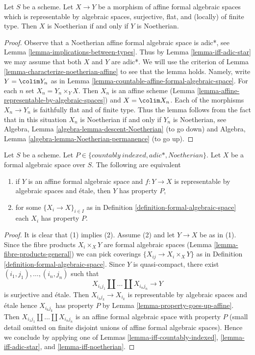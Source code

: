 \begin{lemma}
\label{lemma-iff-noetherian}
Let $S$ be a scheme. Let $X \to Y$ be a morphism of affine
formal algebraic spaces which is representable by algebraic spaces,
surjective, flat, and (locally) of finite type. Then $X$ is Noetherian
if and only if $Y$ is Noetherian.
\end{lemma}

\begin{proof}
Observe that a Noetherian affine formal algebraic space is adic*, see
Lemma \ref{lemma-implications-between-types}. Thus by
Lemma \ref{lemma-iff-adic-star} we may assume that both $X$ and $Y$
are adic*. We will use the criterion of
Lemma \ref{lemma-characterize-noetherian-affine}
to see that the lemma holds. Namely, write $Y = \colim Y_n$
as in Lemma \ref{lemma-countable-affine-formal-algebraic-space}.
For each $n$ set $X_n = Y_n \times_Y X$. Then $X_n$ is an
affine scheme (Lemma \ref{lemma-affine-representable-by-algebraic-spaces})
and $X = \colim X_n$. Each of the morphisms $X_n \to Y_n$ is
faithfully flat and of finite type. Thus the lemma follows from the
fact that in this situation $X_n$ is Noetherian if and only if $Y_n$
is Noetherian, see
Algebra, Lemma \ref{algebra-lemma-descent-Noetherian} (to go down)
and
Algebra, Lemma \ref{algebra-lemma-Noetherian-permanence} (to go up).
\end{proof}

\begin{lemma}
\label{lemma-type-local}
Let $S$ be a scheme. Let $P \in \{countably\ indexed, adic*, Noetherian\}$.
Let $X$ be a formal algebraic space over $S$.
The following are equivalent
\begin{enumerate}
\item if $Y$ is an affine formal algebraic space and
$f : Y \to X$ is representable by algebraic spaces and \'etale,
then $Y$ has property $P$,
\item for some $\{X_i \to X\}_{i \in I}$ as in
Definition \ref{definition-formal-algebraic-space}
each $X_i$ has property $P$.
\end{enumerate}
\end{lemma}

\begin{proof}
It is clear that (1) implies (2). Assume (2) and let
$Y \to X$ be as in (1). Since the fibre products $X_i \times_X Y$
are formal algebraic spaces (Lemma \ref{lemma-fibre-products-general})
we can pick coverings $\{X_{ij} \to X_i \times_X Y\}$ as in
Definition \ref{definition-formal-algebraic-space}.
Since $Y$ is quasi-compact, there exist
$(i_1, j_1), \ldots, (i_n, j_n)$ such that
$$
X_{i_1 j_1} \amalg \ldots \amalg X_{i_n j_n} \longrightarrow Y
$$
is surjective and \'etale. Then $X_{i_kj_k} \to X_{i_k}$ is representable
by algebraic spaces and \'etale hence $X_{i_kj_k}$ has property $P$ by
Lemma \ref{lemma-property-goes-up-affine}.
Then $X_{i_1 j_1} \amalg \ldots \amalg X_{i_n j_n}$ is an
affine formal algebraic space with property $P$ (small detail
omitted on finite disjoint unions of affine formal algebraic spaces).
Hence we conclude by applying one of
Lemmas \ref{lemma-iff-countably-indexed},
\ref{lemma-iff-adic-star}, and
\ref{lemma-iff-noetherian}.
\end{proof}

